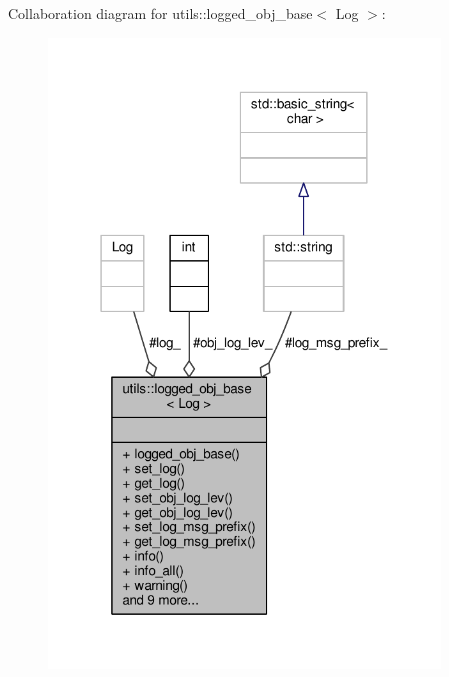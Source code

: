 Collaboration diagram for utils\-:\-:logged\-\_\-obj\-\_\-base$<$ Log $>$\-:
\nopagebreak
\begin{figure}[H]
\begin{center}
\leavevmode
\includegraphics[width=295pt]{classutils_1_1logged__obj__base__coll__graph}
\end{center}
\end{figure}
